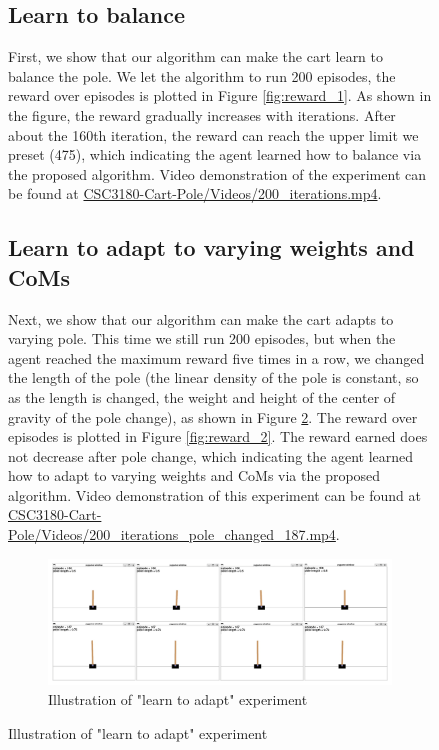 \documentclass[10pt,a4paper]{article}
\begin{document}
\begin{figure}[H]
	\subsection{Learn to balance}
	First, we show that our algorithm can make the cart learn to balance the pole. We let the algorithm to run 200 episodes, the reward over episodes is plotted in Figure \ref{fig:reward_1}. 
	As shown in the figure, the reward gradually increases with iterations. After about the 160th iteration, the reward can reach the upper limit we preset (475), which indicating the agent learned how to balance via the proposed algorithm. Video demonstration of the experiment can be found at \href{https://1drv.ms/f/s!AmutmbT5H6Pkm0sNJx83Q54XewmB?e=HUkzYK}{CSC3180-Cart-Pole/Videos/200\_iterations.mp4}.
	
	
	
	\subsection{Learn to adapt to varying weights and CoMs}
	Next, we show that our algorithm can make the cart adapts to varying pole. This time we still run 200 episodes, but when the agent reached the maximum reward five times in a row, we changed the length of the pole (the linear density of the pole is constant, so as the length is changed, the weight and height of the center of gravity of the pole change), as shown in Figure \ref{fig:changepole}. The reward over episodes is plotted in Figure \ref{fig:reward_2}. The reward earned does not decrease after pole change, which indicating the agent learned how to adapt to varying weights and CoMs via the proposed algorithm. Video demonstration of this experiment can be found at \href{https://1drv.ms/f/s!AmutmbT5H6Pkm0sNJx83Q54XewmB?e=HUkzYK}{CSC3180-Cart-Pole/Videos/200\_iterations\_pole\_changed\_187.mp4}.
	
	\begin{figure}
		\centering
		\includegraphics[width=1\linewidth]{figure/change_pole}
		\caption{Illustration of "learn to adapt" experiment}
		\label{fig:changepole}
	\end{figure}
	

\end{figure}
\end{document}

